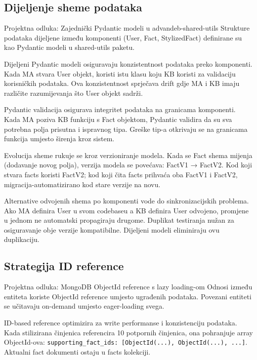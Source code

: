 \documentclass[12pt,a4paper]{article}
\begin{document}
\subsection{Dijeljenje sheme podataka}

\begin{rationale}{Projektna odluka: Zajednički Pydantic modeli u advandeb-shared-utils}
Strukture podataka dijeljene između komponenti (User, Fact, StylizedFact) definirane su kao Pydantic modeli u shared-utils paketu.
\end{rationale}

Dijeljeni Pydantic modeli osiguravaju konzistentnost podataka preko komponenti. Kada MA stvara User objekt, koristi istu klasu koju KB koristi za validaciju korisničkih podataka. Ova konzistentnost sprječava drift gdje MA i KB imaju različite razumijevanja što User objekt sadrži.

Pydantic validacija osigurava integritet podataka na granicama komponenti. Kada MA poziva KB funkciju s Fact objektom, Pydantic validira da su sva potrebna polja prisutna i ispravnog tipa. Greške tip-a otkrivaju se na granicama funkcija umjesto širenja kroz sistem.

Evolucija sheme rukuje se kroz verzioniranje modela. Kada se Fact shema mijenja (dodavanje novog polja), verzija modela se povećava: FactV1 → FactV2. Kod koji stvara facts koristi FactV2; kod koji čita facts prihvaća oba FactV1 i FactV2, migracija-automatizirano kod stare verzije na novu.

Alternative odvojenih shema po komponenti vode do sinkronizacijskih problema. Ako MA definira User u svom codebaseu a KB definira User odvojeno, promjene u jednom ne automatski propagiraju drugome. Duplikat testiranja nužan za osiguravanje obje verzije kompatibilne. Dijeljeni modeli eliminiraju ovu duplikaciju.

\subsection{Strategija ID reference}

\begin{rationale}{Projektna odluka: MongoDB ObjectId reference s lazy loading-om}
Odnosi između entiteta koriste ObjectId reference umjesto ugrađenih podataka. Povezani entiteti se učitavaju on-demand umjesto eager-loading svega.
\end{rationale}

ID-based reference optimizira za write performanse i konzistenciju podataka. Kada stilizirana činjenica referencira 10 potpornih činjenica, ona pohranjuje array ObjectId-ova: \texttt{supporting\_fact\_ids: [ObjectId(...), ObjectId(...), ...]}. Aktualni fact dokumenti ostaju u facts kolekciji.
\end{document}
